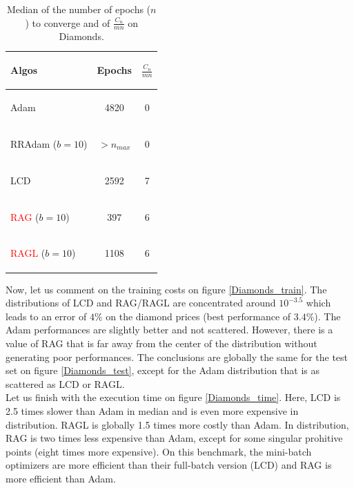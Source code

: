 \begin{table}[h!]
	\centering
	\begin{tabular}{lcc}
		\toprule
		\begin{bf} Algos \end{bf} & \begin{bf}Epochs \end{bf} & \begin{bf}$\frac{C_n}{mn}$\end{bf} \\ \midrule
		\begin{bf}Adam\end{bf} & 4820 & 0 \\ \midrule
		\begin{bf}RRAdam ($b=10$)\end{bf} & $>n_{max}$ & 0 \\ \midrule
		\begin{bf}LCD\end{bf} & 2592 & 7 \\ \midrule
		\begin{bf}\textcolor{red}{RAG} ($b=10$)\end{bf} & 397 & 6 \\ \midrule
		\begin{bf}\textcolor{red}{RAGL} ($b=10$)\end{bf} & 1108 & 6 \\ \bottomrule  
	\end{tabular}
	\caption{Median of the number of epochs ($n$) to converge and of $\frac{C_n}{mn}$ on Diamonds.}
	\label{Diamonds_epochs}
\end{table}

Now, let us comment on the training costs on figure \ref{Diamonds_train}. The distributions of LCD and RAG/RAGL are concentrated around $10^{-3.5}$ which leads to an error of $4\%$ on the diamond prices (best performance of $3.4\%$). The Adam performances are slightly better and not scattered. However, there is a value of RAG that is far away from the center of the distribution without generating poor performances. The conclusions are globally the same for the test set on figure \ref{Diamonds_test}, except for the Adam distribution that is as scattered as LCD or RAGL. \\
Let us finish with the execution time on figure \ref{Diamonds_time}. Here, LCD is 2.5 times slower than Adam in median and is even more expensive in distribution. RAGL is globally 1.5 times more costly than Adam. In distribution, RAG is two times less expensive than Adam, except for some singular prohitive points (eight times more expensive). On this benchmark, the mini-batch optimizers are more efficient than their full-batch version (LCD) and RAG is more efficient than Adam.

